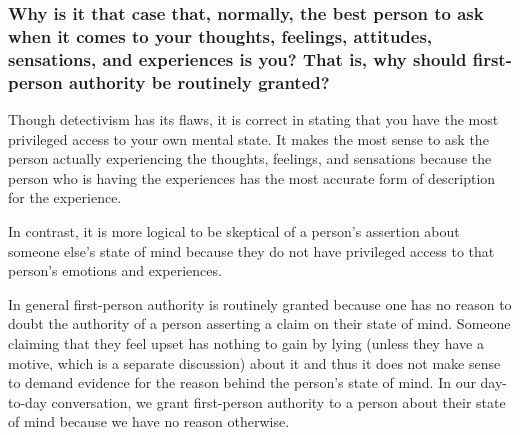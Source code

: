 \documentclass{article}
\begin{document}
\subsubsection*{Why is it that case that, normally, the best person to ask when
it comes to your thoughts, feelings, attitudes, sensations, and experiences is
you? That is, why should first-person authority be routinely granted?}
Though detectivism has its flaws, it is correct in stating that you have the
most privileged access to your own mental state. It makes the most sense to
ask the person actually experiencing the thoughts, feelings, and sensations
because the person who is having the experiences has the most accurate
form of description for the experience. \par
In contrast, it is more logical to be skeptical of a person's assertion
about someone else's state of mind because they do not have privileged access
to that person's emotions and experiences. \par
In general first-person authority is routinely granted because one has no
reason to doubt the authority of a person asserting a claim on their state
of mind. Someone claiming that they feel upset has nothing to gain by lying
(unless they have a motive, which is a separate discussion) about it and thus
it does not make sense to demand evidence for the reason behind the person's
state of mind. In our day-to-day conversation, we grant first-person
authority to a person about their state of mind because we have no reason
otherwise.
\end{document}
